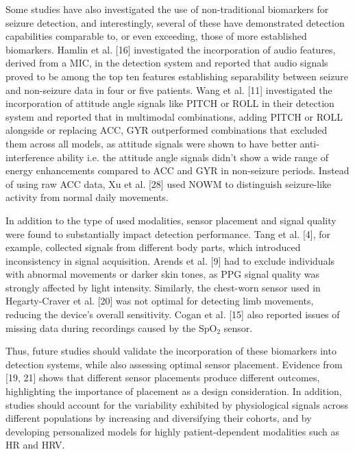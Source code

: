 Some studies have also investigated the use of non-traditional biomarkers for seizure detection, and interestingly, several of these have demonstrated detection capabilities comparable to, or even exceeding, those of more established biomarkers. Hamlin et al. [16] investigated the incorporation of audio features, derived from a MIC, in the detection system and reported that audio signals proved to be among the top ten features establishing separability between seizure and non-seizure data in four or five patients. Wang et al. [11] investigated the incorporation of attitude angle signals  like PITCH or ROLL in their detection system and reported that in multimodal combinations, adding PITCH or ROLL alongside or replacing ACC, GYR outperformed combinations that excluded them across all models, as attitude signals were shown to have better anti-interference ability i.e. the attitude angle signals didn’t show a wide range of energy enhancements compared to ACC and GYR in non-seizure periods.  Instead of using raw ACC data, Xu et al. [28] used NOWM to distinguish seizure-like activity from normal daily movements.

In addition to the type of used modalities, sensor placement and signal quality were found to substantially impact detection performance. Tang et al. [4], for example, collected signals from different body parts, which introduced inconsistency in signal acquisition. Arends et al. [9] had to exclude individuals with abnormal movements or darker skin tones, as PPG signal quality was strongly affected by light intensity. Similarly, the chest-worn sensor used in Hegarty-Craver et al. [20] was not optimal for detecting limb movements, reducing the device’s overall sensitivity. Cogan et al. [15] also reported issues of missing data during recordings caused by the SpO$_2$ sensor.

Thus, future studies should validate the incorporation of these biomarkers into detection systems, while also assessing optimal sensor placement. Evidence from [19, 21] shows that different sensor placements produce different outcomes, highlighting the importance of placement as a design consideration. In addition, studies should account for the variability exhibited by physiological signals across different populations by increasing and diversifying their cohorts, and by developing personalized models for highly patient-dependent modalities such as HR and HRV.

